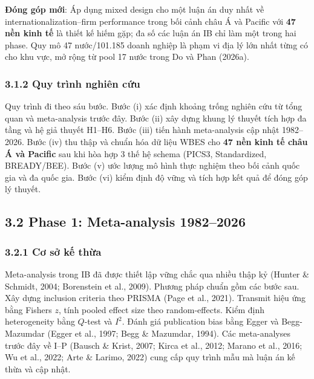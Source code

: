 \documentclass[12pt,a4paper]{article}
\begin{document}
\textbf{Đóng góp mới}: Áp dụng mixed design cho một luận án duy nhất về
internationalization--firm performance trong bối cảnh châu Á và Pacific
với \textbf{47 nền kinh tế} là thiết kế hiếm gặp; đa số các luận án IB
chỉ làm một trong hai phase. Quy mô 47 nước/101.185 doanh nghiệp là phạm
vi địa lý lớn nhất từng có cho khu vực, mở rộng từ pool 17 nước trong Do
và Phan (2026a).

\hypertarget{312-quy-truxecnh-nghiuxean-cux1ee9u}{%
\subsubsection{3.1.2 Quy trình nghiên
cứu}\label{312-quy-truxecnh-nghiuxean-cux1ee9u}}

Quy trình đi theo sáu bước. Bước (i) xác định khoảng trống nghiên cứu từ
tổng quan và meta-analysis trước đây. Bước (ii) xây dựng khung lý thuyết
tích hợp đa tầng và hệ giả thuyết H1--H6. Bước (iii) tiến hành
meta-analysis cập nhật 1982--2026. Bước (iv) thu thập và chuẩn hóa dữ
liệu WBES cho \textbf{47 nền kinh tế châu Á và Pacific} sau khi hòa hợp
3 thế hệ schema (PICS3, Standardized, BREADY/BEE). Bước (v) ước lượng mô
hình thực nghiệm theo bối cảnh quốc gia và đa quốc gia. Bước (vi) kiểm
định độ vững và tích hợp kết quả để đóng góp lý thuyết.

\hypertarget{32-phase-1-meta-analysis-19822026}{%
\subsection{3.2 Phase 1: Meta-analysis
1982--2026}\label{32-phase-1-meta-analysis-19822026}}

\hypertarget{321-cux1a1-sux1edf-kux1ebf-thux1eeba}{%
\subsubsection{3.2.1 Cơ sở kế
thừa}\label{321-cux1a1-sux1edf-kux1ebf-thux1eeba}}

Meta-analysis trong IB đã được thiết lập vững chắc qua nhiều thập kỷ
(Hunter \& Schmidt, 2004; Borenstein et al., 2009). Phương pháp chuẩn
gồm các bước sau. Xây dựng inclusion criteria theo PRISMA (Page et al.,
2021). Transmit hiệu ứng bằng Fisher\textquotesingle s \(z\), tính
pooled effect size theo random-effects. Kiểm định heterogeneity bằng
\(Q\)-test và \(I^2\). Đánh giá publication bias bằng Egger và
Begg-Mazumdar (Egger et al., 1997; Begg \& Mazumdar, 1994). Các
meta-analyses trước đây về I--P (Bausch \& Krist, 2007; Kirca et al.,
2012; Marano et al., 2016; Wu et al., 2022; Arte \& Larimo, 2022) cung
cấp quy trình mẫu mà luận án kế thừa và cập nhật.
\end{document}

